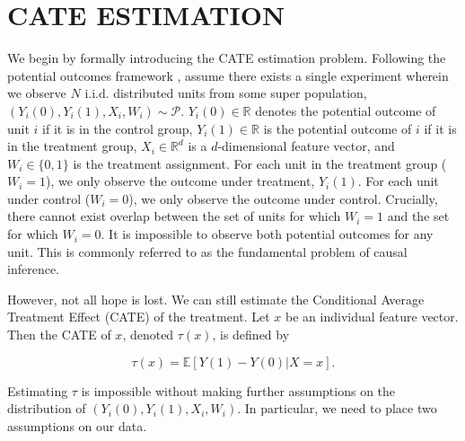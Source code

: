 \newcommand{\Pcal}{\mathcal{P}}
\newcommand{\R}{\mathbb{R}}
\newcommand{\Yobs}{Y^{obs}}
\newcommand{\E}{\mathbb{E}}
\newcommand{\define}{:=}
\renewcommand{\P}{\mathbb{P}}
\newcommand{\emin}{e_{\mbox{\small min}}}
\newcommand{\emax}{e_{\mbox{\small max}}}

\section{CATE ESTIMATION}

We begin by formally introducing the CATE estimation problem. 
Following the potential outcomes framework \citep{rubin1974estimating}, assume there exists a single experiment wherein we observe $N$ i.i.d. distributed units from some super population, $(Y_i(0), Y_i(1), X_i, W_i) \sim \Pcal$. $Y_i(0) \in \R$ denotes the potential outcome of unit $i$ if it is in the control group, $Y_i(1)\in \R$ is the potential outcome of $i$ if it is in the treatment group, $X_i \in \R^d$ is a $d$-dimensional feature vector, and $W_i \in \{0,1\}$ is the treatment assignment.
For each unit in the treatment group ($W_i = 1$), we only observe the outcome under treatment, $Y_i(1)$. For each unit under control ($W_i = 0$), we only observe the outcome under control. Crucially, there cannot exist overlap between the set of units for which $W_i = 1$ and the set for which $W_i = 0$. It is impossible to observe both potential outcomes for any unit. This is commonly referred to as the fundamental problem of causal inference. 


However, not all hope is lost. We can still estimate the Conditional Average Treatment Effect (CATE) of the treatment. Let $x$ be an individual feature vector. Then the CATE of $x$, denoted $\tau(x)$, is defined by %

$$\tau(x) = \E[Y(1) - Y(0) | X = x].$$

Estimating $\tau$ is impossible without making further assumptions on the distribution of $(Y_i(0), Y_i(1), X_i, W_i)$. In particular, we need to place two assumptions on our data. 




